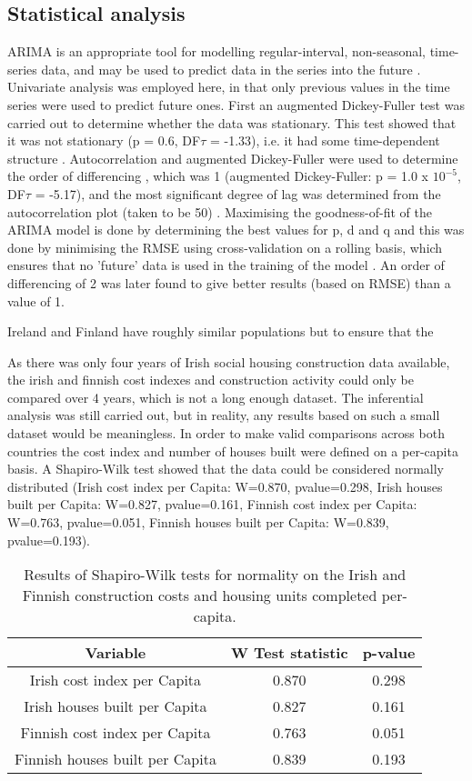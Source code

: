 \documentclass[hidelinks,12pt,oneside]{report} %
\begin{document}
\subsection{Statistical analysis}
ARIMA is an appropriate tool for modelling regular-interval, non-seasonal, time-series data, and may be used to predict data in the series into the future \citep{MSc}. Univariate analysis was employed here, in that only previous values in the time series were used to predict future ones. First an augmented Dickey-Fuller test was carried out to determine whether the data was stationary. This test showed that it was not stationary (p = 0.6, DF$\tau$ = -1.33), i.e. it had some time-dependent structure \citep{DF}. Autocorrelation and augmented Dickey-Fuller were used to determine the order of differencing \citep{Raval}, which was 1 (augmented Dickey-Fuller: p = 1.0 x $10^{-5}$, DF$\tau$ = -5.17), and the most significant degree of lag was determined from the autocorrelation plot (taken to be 50) \citep{Raval, Nadeem}. Maximising the goodness-of-fit of the ARIMA model is done by determining the best values for p, d and q and this was done by minimising the RMSE \citep{Raval, SaS} using cross-validation on a rolling basis, which ensures that no 'future' data is used in the training of the model \citep{SS, Hyn}. An order of differencing of 2 was later found to give better results (based on RMSE) than a value of 1.

Ireland and Finland have roughly similar populations \citep{eurostat} but to ensure that the 

As there was only four years of Irish social housing construction data available, the irish and finnish cost indexes and construction activity could only be compared over 4 years, which is not a long enough dataset. The inferential analysis was still carried out, but in reality, any results based on such a small dataset would be meaningless. In order to make valid comparisons across both countries the cost index and number of houses built were defined on a per-capita basis. A Shapiro-Wilk test showed that the data could be considered normally distributed (Irish cost index per Capita: W=0.870, pvalue=0.298, Irish houses built per Capita: W=0.827, pvalue=0.161, Finnish cost index per Capita: W=0.763, pvalue=0.051, Finnish houses built per Capita: W=0.839, pvalue=0.193).

\begin{table}[h!]
\centering
\begin{tabular}{||c | c | c ||} 
 \hline
 Variable & W Test statistic & p-value \\ [0.0ex] 
 \hline\hline
 Irish cost index per Capita & 0.870 & 0.298 \\ 
 \hline
 Irish houses built per Capita & 0.827 & 0.161 \\
 \hline
 Finnish cost index per Capita & 0.763 & 0.051 \\
 \hline
  Finnish houses built per Capita & 0.839 & 0.193 \\ [0.0ex] 
 \hline
\end{tabular}
\caption{Results of Shapiro-Wilk tests for normality on the Irish and Finnish construction costs and housing units completed per-capita.}
\label{table:1}
\end{table}
 
\end{document}
